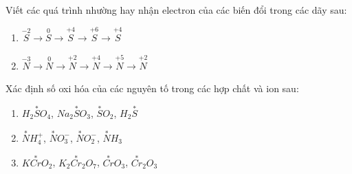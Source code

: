 	\begin{bt}%
		Viết các quá trình nhường hay nhận electron của các biến đổi trong các dãy sau:
		\begin{enumerate}
			\item $\overset{-2}{S} \longrightarrow \overset{0}{S} \longrightarrow \overset{+4}{S} \longrightarrow \overset{+6}{S} \longrightarrow \overset{+4}{S}$
			\item $\overset{-3}{N} \longrightarrow \overset{0}{N} \longrightarrow \overset{+2}{N} \longrightarrow \overset{+4}{N} \longrightarrow \overset{+5}{N} \longrightarrow \overset{+2}{N}$
		\end{enumerate}
	\end{bt}
	\begin{bt}%
		Xác định số oxi hóa của các nguyên tố trong các hợp chất và ion sau:
		\begin{enumerate}
			\item $H_2\overset{*}{S}O_4$, $Na_2\overset{*}{S}O_3$, $\overset{*}{S}O_2$, $H_2\overset{*}{S}$
			\item $\overset{*}{N}H_4^+$, $\overset{*}{N}O_3^-$, $\overset{*}{N}O_2^-$, $\overset{*}{N}H_3$
			\item $K\overset{*}{Cr}O_2$, $K_2\overset{*}{Cr}_2O_7$, $\overset{*}{Cr}O_3$, $\overset{*}{Cr}_2O_3$
		\end{enumerate}
	\end{bt}
